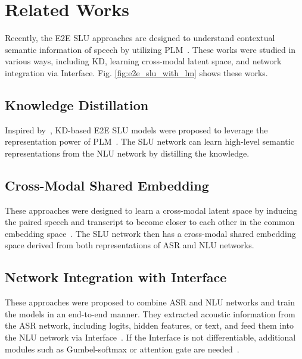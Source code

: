 \documentclass{article}
\begin{document}
\vspace{-6mm}
\section{Related Works}

Recently, the E2E SLU approaches are designed to understand contextual semantic information of speech by utilizing PLM~\cite{lai2020semi,chung2021splat}.
These works were studied in various ways, including KD, learning cross-modal latent space, and network integration via Interface.
Fig. \ref{fig:e2e_slu_with_lm} shows these works.

\vspace{-4mm}
\subsection{Knowledge Distillation}
Inspired by~\cite{hinton2015distilling}, KD-based E2E SLU models were proposed to leverage the representation power of PLM~\cite{Cho2020,kim2021two}. The SLU network can learn high-level semantic representations from the NLU network by distilling the knowledge.

\vspace{-4mm}
\subsection{Cross-Modal Shared Embedding}
These approaches were designed to learn a cross-modal latent space by inducing the paired speech and transcript to become closer to each other in the common embedding space~\cite{agrawal2020tie,kim2021st}. The SLU network then has a cross-modal shared embedding space derived from both representations of ASR and NLU networks.

\vspace{-4mm}
\subsection{Network Integration with Interface}
These approaches were proposed to combine ASR and NLU networks and train the models in an end-to-end manner. 
They extracted acoustic information from the ASR network, including logits, hidden features, or text, and feed them into the NLU network via Interface~\cite{saxon2021end}. 
If the Interface is not differentiable, additional modules such as Gumbel-softmax or attention gate are needed~\cite{rao2021mean,saxon2021end,chen2021top}.
\end{document}
